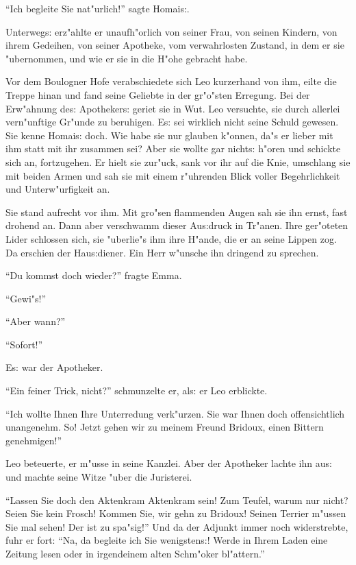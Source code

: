 \documentclass[oneside,12pt]{book}
\newcommand{\s}{s:}%
\begin{document}
"`Ich begleite Sie nat"urlich!"' sagte Homai{\s}.

Unterweg{\s} erz"ahlte er unaufh"orlich von seiner Frau, von
seinen Kindern, von ihrem Gedeihen, von seiner Apotheke, vom
verwahrlosten Zustand, in dem er sie "ubernommen, und wie er sie
in die H"ohe gebracht habe.

Vor dem Boulogner Hofe verabschiedete sich Leo kurzerhand von ihm,
eilte die Treppe hinan und fand seine Geliebte in der gr"o"sten
Erregung. Bei der Erw"ahnung de{\s} Apotheker{\s} geriet sie in
Wut. Leo versuchte, sie durch allerlei vern"unftige Gr"unde zu
beruhigen. E{\s} sei wirklich nicht seine Schuld gewesen. Sie
kenne Homai{\s} doch. Wie habe sie nur glauben k"onnen, da"s er
lieber mit ihm statt mit ihr zusammen sei? Aber sie wollte gar
nicht{\s} h"oren und schickte sich an, fort\/zugehen. Er hielt sie
zur"uck, sank vor ihr auf die Knie, umschlang sie mit beiden Armen
und sah sie mit einem r"uhrenden Blick voller Begehrlichkeit und
Unterw"urfigkeit an.

Sie stand aufrecht vor ihm. Mit gro"sen flammenden Augen sah sie
ihn ernst, fast drohend an. Dann aber verschwamm dieser Au{\s}druck
in Tr"anen. Ihre ger"oteten Lider schlossen sich, sie "uberlie"s
ihm ihre H"ande, die er an seine Lippen zog. Da erschien der
Hau{\s}diener. Ein Herr w"unsche ihn dringend zu sprechen.

"`Du kommst doch wieder?"' fragte Emma.

"`Gewi"s!"'

"`Aber wann?"'

"`Sofort!"'

E{\s} war der Apotheker.

"`Ein feiner Trick, nicht?"' schmunzelte er, al{\s} er Leo
erblickte.

"`Ich wollte Ihnen Ihre Unterredung verk"urzen. Sie war Ihnen doch
offensichtlich unangenehm. So! Jetzt gehen wir zu meinem Freund
Bridoux, einen Bittern genehmigen!"'

Leo beteuerte, er m"usse in seine Kanzlei. Aber der Apotheker
lachte ihn au{\s} und machte seine Witze "uber die Juristerei.

"`Lassen Sie doch den Aktenkram Aktenkram sein! Zum Teufel, warum
nur nicht? Seien Sie kein Frosch! Kommen Sie, wir gehn zu Bridoux!
Seinen Terrier m"ussen Sie mal sehen! Der ist zu spa"sig!"' Und da
der Adjunkt immer noch widerstrebte, fuhr er fort: "`Na, da
begleite ich Sie wenigsten{\s}! Werde in Ihrem Laden eine Zeitung
lesen oder in irgendeinem alten Schm"oker bl"attern."'
\end{document}
